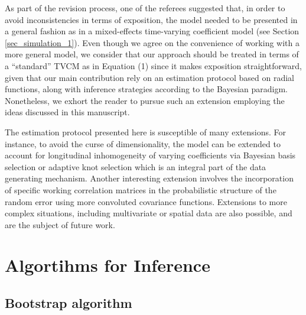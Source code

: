 \documentclass[letterpaper,10pt,openany]{article}
\begin{document}
{\color{black} As part of the revision process, one of the referees suggested that, in order to avoid inconsistencies in terms of exposition, the model needed to be presented in a general fashion as in a mixed-effects time-varying coefficient model (see Section \ref{sec_simulation_1}). Even though we agree on the convenience of working with a more general model, we consider that our approach should be treated in terms of a ``standard'' \textsf{TVCM} as in Equation (1) since it makes exposition straightforward, given that our main contribution rely on an estimation protocol based on radial functions, along with inference strategies according to the Bayesian paradigm.  Nonetheless, we exhort the reader to pursue such an extension employing the ideas discussed in this manuscript.}


The estimation protocol presented here is susceptible of many extensions. For instance, to avoid the curse of dimensionality, the model can be extended to account for longitudinal inhomogeneity of varying coefficients via Bayesian basis selection or adaptive knot selection which is an integral part of the data generating mechanism. Another interesting extension involves the incorporation of specific working correlation matrices in the probabilistic structure of the random error using more convoluted covariance functions. Extensions to more complex situations, including multivariate or spatial data are also possible, and are the subject of future work.







\appendix


\section{Algortihms for Inference }


\subsection{Bootstrap algorithm}\label{app_bootstrap} 
\end{document}
